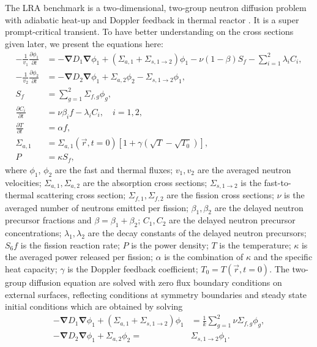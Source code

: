 \documentclass[12pt]{scrartcl}
\newcommand{\grad}{\bs{\nabla}}
\newcommand{\bs}[1]{\mathbf{#1}}
\begin{document}
The LRA benchmark is a two-dimensional, two-group neutron diffusion problem with adiabatic heat-up and Doppler feedback in thermal reactor \cite{ANL_BPB}.  It is a super prompt-critical transient.  To have better understanding on the cross sections given later, we present the equations here:
\begin{align}
-\frac{1}{v_1} \frac{\partial \phi_1}{\partial t} &= -\grad D_1 \grad\phi_1 + (\Sigma_{a,1} + \Sigma_{s, 1\rightarrow 2})\phi_1 - \nu(1-\beta)S_f  - \sum_{i=1}^2 \lambda_i C_i, \\
-\frac{1}{v_2} \frac{\partial \phi_2}{\partial t} &= -\grad D_2 \grad\phi_1 + \Sigma_{a,2}\phi_2 - \Sigma_{s, 1\rightarrow 2}\phi_1, \\
S_f &= \sum_{g=1}^2 \Sigma_{f,g} \phi_g, \\
\frac{\partial C_i}{\partial t} &= \nu\beta_i f - \lambda_i C_i, \quad i=1,2, \\
\frac{\partial T}{\partial t} &= \alpha f, \label{eq:lra-temp} \\
\Sigma_{a,1} &= \Sigma_{a,1}(\vec{r}, t=0) \left[1+\gamma\left(\sqrt{T} - \sqrt{T_0}\right)\right], \\
P &= \kappa S_f,
\end{align}
where $\phi_1$, $\phi_2$ are the fast and thermal fluxes; $v_1, v_2$ are the averaged neutron velocities; $\Sigma_{a,1}, \Sigma_{a,2}$ are the absorption cross sections; $\Sigma_{s,1\rightarrow 2}$ is the fast-to-thermal scattering cross section; $\Sigma_{f,1}, \Sigma_{f,2}$ are the fission cross sections; $\nu$ is the averaged number of neutrons emitted per fission; $\beta_1, \beta_2$ are the delayed neutron precursor fractions and $\beta=\beta_1 + \beta_2$; $C_1, C_2$ are the delayed neutron precursor concentrations; $\lambda_1, \lambda_2$ are the decay constants of the delayed neutron precursors; $S_6f$ is the fission reaction rate; $P$ is the power density; $T$ is the temperature; $\kappa$ is the averaged power released per fission; $\alpha$ is the combination of $\kappa$ and the specific heat capacity; $\gamma$ is the Doppler feedback coefficient; $T_0=T(\vec{r}, t=0)$.
The two-group diffusion equation are solved with zero flux boundary conditions on external surfaces, reflecting conditions at symmetry boundaries and steady state initial conditions which are obtained by solving
\begin{align}
-\grad D_1 \grad\phi_1 + (\Sigma_{a,1} + \Sigma_{s, 1\rightarrow 2})\phi_1 &= \frac{1}{k}\sum_{g=1}^2 \nu\Sigma_{f,g}\phi_g, \\
-\grad D_2 \grad\phi_1 + \Sigma_{a,2}\phi_2 =& \Sigma_{s, 1\rightarrow 2}\phi_1. \\
\end{align}
\end{document}
